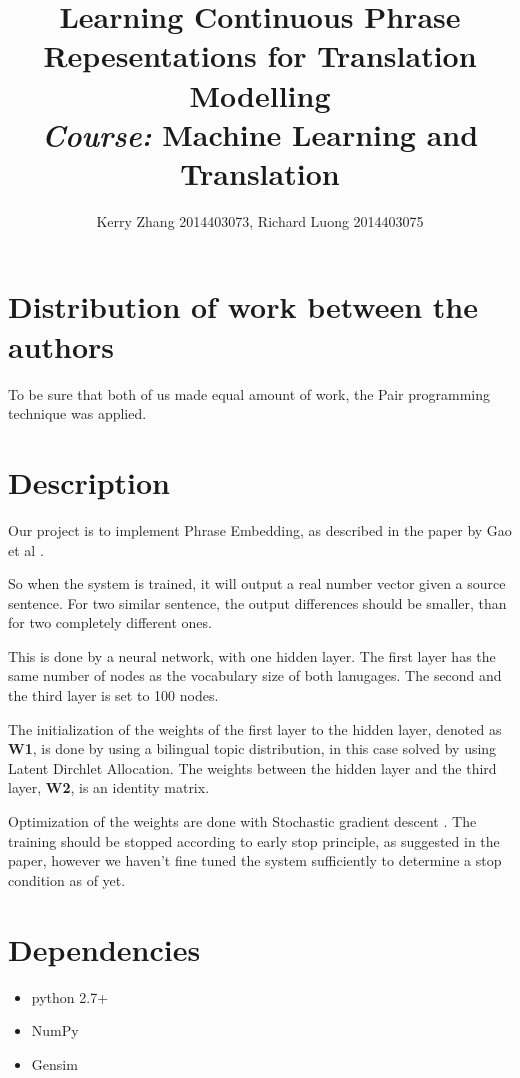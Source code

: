 \documentclass[a4paper]{article}
\author{Kerry Zhang 2014403073, Richard Luong 2014403075}
\title{Learning Continuous Phrase Repesentations for Translation Modelling\\
\large \emph{Course:} Machine Learning and Translation}
\begin{document}
\maketitle

\pagebreak

\tableofcontents

\pagebreak

\section{Distribution of work between the authors}

To be sure that both of us made equal amount of work, the Pair programming \cite{ wiki:1} technique was applied. 

\section{Description}

Our project is to implement Phrase Embedding, as described in the paper by Gao et al \cite{gao2014learning}.

So when the system is trained, it will output a real number vector given a source sentence. For two similar sentence, the output differences should be smaller, than for two completely different ones.

This is done by a neural network, with one hidden layer. The first layer has the same number of nodes as the vocabulary size of both lanugages. The second and the third layer is set to 100 nodes.

The initialization of the weights of the first layer to the hidden layer, denoted as \textbf{W1}, is done by using a bilingual topic distribution, in this case solved by using Latent Dirchlet Allocation. The weights between the hidden layer and the third layer, \textbf{W2}, is an identity matrix.

Optimization of the weights are done with Stochastic gradient descent \cite{ wiki:2}. The training should be stopped according to early stop principle, as suggested in the paper, however we haven't fine tuned the system sufficiently to determine a stop condition as of yet.

\section{Dependencies}

\begin{itemize}
\item python 2.7+
\item NumPy \cite{numpy}
\item Gensim \cite{gensim}
\end{itemize}
\end{document}
